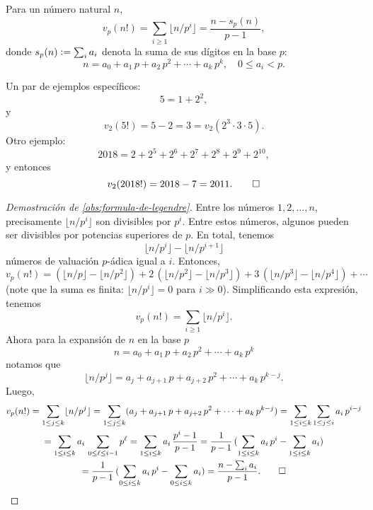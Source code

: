 \documentclass{article}
\numberwithin{equation}{section}
\theoremstyle{definition}
\begin{document}
\begin{observacion}
  \label{obs:formula-de-legendre}
  Para un número natural $n$,
  $$v_p (n!) = \sum_{i\ge 1} \lfloor n/p^i\rfloor = \frac{n - s_p (n)}{p-1},$$
  donde $s_p (n) \mathrel{\mathop:}= \sum_i a_i$ denota la suma de sus dígitos en la base $p$:
  $$n = a_0 + a_1\,p + a_2\,p^2 + \cdots + a_k\,p^k, \quad 0 \le a_i < p.$$
\end{observacion}

\begin{ejemplo}
  Un par de ejemplos específicos:
  $$5 = 1 + 2^2,$$
  y
  $$v_2 (5!) = 5 - 2 = 3 = v_2 (2^3\cdot 3\cdot 5).$$
  Otro ejemplo:
  $$2018 = 2 + 2^5 + 2^6 + 2^7 + 2^8 + 2^9 + 2^{10},$$
  y entonces
 \[ v_2 (2018!) = 2018 - 7 = 2011. \qedhere \]
\end{ejemplo}

\begin{proof}[Demostración de \ref{obs:formula-de-legendre}]
  Entre los números $1,2,\ldots,n$, precisamente $\lfloor n/p^i \rfloor$
  son divisibles por $p^i$. Entre estos números, algunos pueden ser divisibles
  por potencias superiores de $p$. En total, tenemos
  $$\lfloor n/p^i \rfloor - \lfloor n/p^{i+1}\rfloor$$
  números de valuación $p$-ádica igual a $i$. Entonces,
  \[ v_p (n!) =
     (\lfloor n/p\rfloor - \lfloor n/p^2\rfloor) +
     2\,(\lfloor n/p^2\rfloor - \lfloor n/p^3\rfloor) +
     3\,(\lfloor n/p^3 \rfloor - \lfloor n/p^4\rfloor) + \cdots \]
  (note que la suma es finita: $\lfloor n/p^i \rfloor = 0$ para
  $i\gg 0$). Simplificando esta expresión, tenemos
  $$v_p (n!) = \sum_{i\ge 1} \lfloor n/p^i \rfloor.$$
  Ahora para la expansión de $n$ en la base $p$
  $$n = a_0 + a_1\,p + a_2\,p^2 + \cdots + a_k\,p^k$$
  notamos que
  \[ \lfloor n/p^j \rfloor =
     a_j + a_{j+1}\,p + a_{j+2}\,p^2 + \cdots + a_k\,p^{k-j}. \]
  Luego,
  \begin{multline*}
    v_p (n!) = \sum_{1 \le j\le k} \lfloor n/p^j \rfloor
    = \sum_{1\le j\le k} (a_j + a_{j+1}\,p + a_{j+2}\,p^2 + \cdots + a_k\,p^{k-j})
    = \sum_{1 \le i\le k} \sum_{1 \le j \le i} a_i\,p^{i-j}\\
    = \sum_{1 \le i\le k} a_i\,\sum_{0 \le \ell \le i-1} p^\ell
    = \sum_{1 \le i\le k} a_i \, \frac{p^i-1}{p-1}
    = \frac{1}{p-1}\,(\sum_{1 \le i\le k} a_i\,p^i - \sum_{1 \le i\le k} a_i)\\
    = \frac{1}{p-1}\,(\sum_{0 \le i\le k} a_i\,p^i - \sum_{0 \le i\le k} a_i)
    = \frac{n - \sum_i a_i}{p-1}.  \qedhere
  \end{multline*}
\end{proof}
\end{document}
